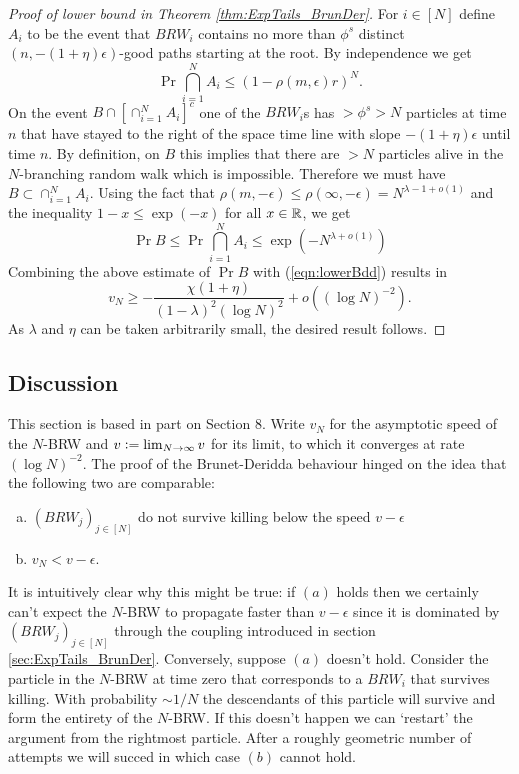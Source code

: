 \begin{proof}[Proof of lower bound in Theorem \ref{thm:ExpTails_BrunDer}]
For $i \in [N]$ define $A_i$ to be the event that $BRW_i$ contains no more than $\phi^s$ distinct $(n, - (1+\eta)\epsilon)$-good paths starting at the root. By independence we get
\begin{equation}
\Pr{\bigcap\limits_{i=1}^N A_i} \leq (1 - \rho(m, \epsilon) r)^N. 
\end{equation}
On the event $B \cap [\cap_{i=1}^N A_i]^c$ one of the $BRW_i$s has $> \phi^s > N$ particles at time $n$ that have stayed to the right of the space time line with slope $ - (1 + \eta)\epsilon$ until time $n$. By definition, on $B$ this implies that there are $> N$ particles alive in the $N$-branching random walk which is impossible. Therefore we must have $B \subset \cap_{i=1}^N A_i$. Using the fact that $\rho(m, - \epsilon) \leq \rho(\infty, - \epsilon) = N^{\lambda - 1 + o(1)}$ and the inequality $1 - x \leq \exp(-x)$ for all $x \in \mathbb{R}$, we get
\begin{equation}\label{eqn:ExpTailsBBound}
\Pr{B} \leq \Pr{\bigcap\limits_{i=1}^N A_i} \leq \exp(-N^{\lambda + o(1)})
\end{equation}
Combining the above estimate of $\Pr{B}$ with (\ref{eqn:lowerBdd}) results in 
\begin{equation}
v_N \geq - \frac{\chi (1 + \eta)}{(1 - \lambda)^2(\log N)^2} + o((\log N)^{-2}). 
\end{equation} 
As $\lambda$ and $\eta$ can be taken arbitrarily small, the desired result follows. 
\end{proof}

\subsection{Discussion}
This section is based in part on \cite{exp_tails} Section 8. Write $v_N$ for the asymptotic speed of the $N$-BRW and $v \vcentcolon= \lim_{N \to \infty} v$ for its limit, to which it converges at rate $(\log N)^{-2}$. The proof of the Brunet-Deridda behaviour hinged on the idea that the following two are comparable:
\begin{enumerate}[(a)]
\item \vspace{-1mm} $(BRW_j)_{j \in [N]}$ do not survive killing below the speed $v - \epsilon$
\item \vspace{-3mm} $v_N < v - \epsilon$. 
\end{enumerate}
\vspace{-3mm}
It is intuitively clear why this might be true: if $(a)$ holds then we certainly can't expect the $N$-BRW to propagate faster than $v - \epsilon$ since it is dominated by $(BRW_j)_{j \in [N]}$ through the coupling introduced in section \ref{sec:ExpTails_BrunDer}. Conversely, suppose $(a)$ doesn't hold. Consider the particle in the $N$-BRW at time zero that corresponds to a $BRW_i$ that survives killing. With probability $ \sim 1/N$ the descendants of this particle will survive and form the entirety of the $N$-BRW. If this doesn't happen we can `restart' the argument from the rightmost particle. After a roughly geometric number of attempts we will succed in which case $(b)$ cannot hold. \\


